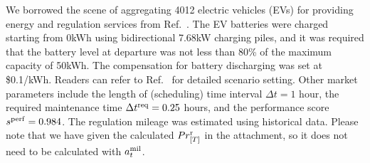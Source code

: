 \documentclass[conference,a4paper]{IEEEtran}
\begin{document}
We borrowed the scene of aggregating 4012 electric vehicles (EVs) for providing energy and regulation services from Ref.~\cite{lyu_co-optimizing_2023}. The EV batteries were charged starting from 0kWh using bidirectional 7.68kW charging piles, and it was required that the battery level at departure was not less than 80\% of the maximum capacity of 50kWh. The compensation for battery discharging was set at \$0.1/kWh. Readers can refer to Ref.~\cite{lyu_co-optimizing_2023} for detailed scenario setting. Other market parameters include the length of (scheduling) time interval $\Delta t = 1$ hour,
the required maintenance time $\Delta t^{\rm req} = 0.25$ hours, and
the performance score $s^{\rm perf} = 0.984$. The regulation mileage was estimated using historical data. Please note that we have given the calculated $Pr^{\rm r}_{[T]}$ in the attachment, so it does not need to be calculated with $a^{\rm mil}_{t}$.





\end{document}
